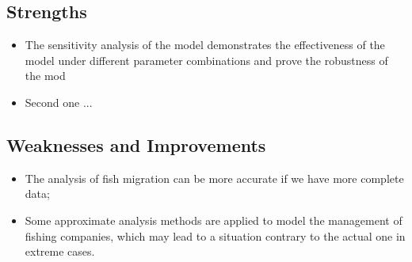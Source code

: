 \documentclass[12pt]{ctexart}
\begin{document}
\subsection{Strengths}%
\begin{itemize}
	\item The sensitivity analysis of the model demonstrates the effectiveness of the model under different parameter combinations and prove the robustness of the mod
	\item Second one ...
\end{itemize}

\subsection{Weaknesses and Improvements}%
\begin{itemize}
	\item The analysis of fish migration can be more accurate if we have more complete data;
	\item Some approximate analysis methods are applied to model the management of fishing
	      companies, which may lead to a situation contrary to the actual one  in extreme cases.
\end{itemize}
















\newpage
\thispagestyle{empty}
\vspace{-6cm}
\end{document}
